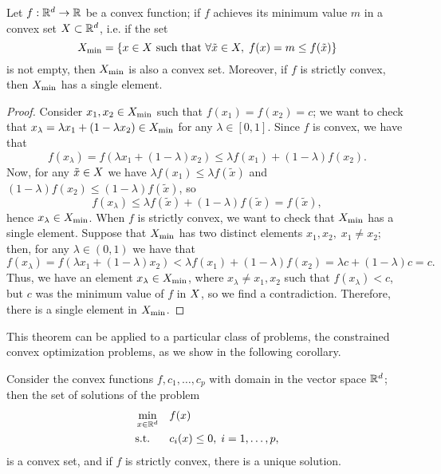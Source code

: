 \begin{theorem}
    Let $f: \mathbb{R}^d \to \mathbb{R}$ be a convex function; if $f$ achieves its minimum value $m$ in a convex set $X \subset \mathbb{R}^d$, i.e. if the set 
    $$ X_{\min} = \left\{x \in X \text{ such that }  \forall \tilde{x} \in X, \;  f(x) = m \leq f(\tilde{x})\right\}$$
    is not empty, then $X_{\min}$ is also a convex set. 
    Moreover, if $f$ is strictly convex, then $X_{\min}$ has a single element.
\end{theorem}
\begin{proof}
    Consider $x_1, x_2 \in X_{\min}$ such that $f(x_1) = f(x_2) = c$; we want to check that $x_\lambda = \lambda x_1 + (1 - \lambda x_2) \in X_{\min}$ for any $\lambda \in [0, 1]$.
    Since $f$ is convex, we have that
    \begin{equation}
        \nonumber
        f(x_\lambda) = f(\lambda x_1 + (1 - \lambda) x_2) \leq \lambda f(x_1) + (1 - \lambda) f(x_2) .
    \end{equation}
    Now, for any $\tilde{x} \in X$ we have $\lambda f(x_1) \leq \lambda f(\tilde{x})$ and $(1 - \lambda) f(x_2) \leq (1 - \lambda) f(\tilde{x})$, so 
    $$f(x_\lambda) \leq  \lambda f(\tilde{x}) + (1 - \lambda) f(\tilde{x}) = f(\tilde{x}),$$ hence $x_\lambda \in X_{\min}$.
    When $f$ is strictly convex, we want to check that $X_{\min}$ has a single element. Suppose that $X_{\min}$ has two distinct elements $x_1, x_2, \; x_1 \neq x_2$; then, for any $\lambda \in (0, 1)$ we have that 
    $$ f(x_\lambda) = f(\lambda x_1 + (1 - \lambda) x_2) < \lambda f(x_1) + (1 - \lambda) f(x_2) = \lambda c + (1- \lambda)c = c.$$
    Thus, we have an element $x_\lambda \in X_{\min}$, where $x_\lambda \neq x_1, x_2$ such that $f(x_\lambda) < c$, but $c$ was the minimum value of $f$ in $X$, so we find a contradiction. Therefore, there is a single element in $X_{\min}$.
\end{proof}
This theorem can be applied to a particular class of problems, the constrained convex optimization problems, as we show in the following corollary.
\begin{corollary}
    Consider the convex functions $f, c_1, \ldots, c_p$ with domain in the vector space $\mathbb{R}^d$; then the set of solutions of the problem
    \begin{equation}\nonumber
        \begin{aligned}
            &\min_{x \in \mathbb{R}^d} & & f(x) \\
            & \text{s.t.} & & c_i(x) \leq 0,\; i=1, \ldots, p ,  
        \end{aligned}
    \end{equation}
    is a convex set, and if $f$ is strictly convex, there is a unique solution.
\end{corollary}

